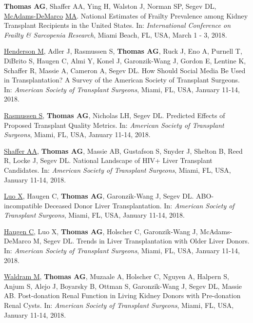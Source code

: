 \documentclass[10pt]{article}
\begin{document}
\begin{bibenum}
\item \textbf{Thomas AG}, Shaffer AA, Ying H, Walston J,
  Norman SP, Segev DL, \underline{McAdams-DeMarco} \underline{MA}.
  National Estimates of Frailty Prevalence among Kidney
  Transplant Recipients in the United States.
  In: \emph{International Conference on Frailty \& Sarcopenia Research},
  Miami Beach, FL, USA, March 1 - 3, 2018.

\item \underline{Henderson M}, Adler J, Rasmussen S, \textbf{Thomas AG},
  Ruck J, Eno A, Purnell T, DiBrito S, Haugen C, Almi Y, Konel J,
  Garonzik-Wang J, Gordon E, Lentine K, Schaffer R, Massie A,
  Cameron A, Segev DL.
  How Should Social Media Be Used in Transplantation? A Survey of
  the American Society of Transplant Surgeons.
  In: \emph{American Society of Transplant Surgeons},
  Miami, FL, USA, January 11-14, 2018.

\item \underline{Rasmussen S}, \textbf{Thomas AG}, Nicholas LH, Segev DL.
  Predicted Effects of Proposed Transplant Quality Metrics.
  In: \emph{American Society of Transplant Surgeons},
  Miami, FL, USA, January 11-14, 2018.

\item \underline{Shaffer AA}, \textbf{Thomas AG}, Massie AB,
  Gustafson S, Snyder J, Shelton B, Reed R, Locke J, Segev DL.
  National Landscape of HIV+ Liver Transplant
  Candidates. In: \emph{American Society of Transplant Surgeons},
  Miami, FL, USA, January 11-14, 2018.

\item \underline{Luo X}, Haugen C, \textbf{Thomas AG}, Garonzik-Wang J,
  Segev DL.
  ABO-incompatible Deceased Donor Liver Transplantation.
  In: \emph{American Society of Transplant Surgeons},
  Miami, FL, USA, January 11-14, 2018.

\item \underline{Haugen C}, Luo X, \textbf{Thomas AG}, Holscher C,
  Garonzik-Wang J, McAdams-DeMarco M, Segev DL.
  Trends in Liver Transplantation with Older Liver Donors.
  In: \emph{American Society of Transplant Surgeons},
  Miami, FL, USA, January 11-14, 2018.

\item \underline{Waldram M}, \textbf{Thomas AG}, Muzaale A,
  Holscher C, Nguyen A, Halpern S, Anjum S, Alejo J, Boyarsky B, Ottman S,
  Garonzik-Wang J, Segev DL, Massie AB. Post-donation Renal Function in Living
  Kidney Donors with Pre-donation Renal Cysts.
  In: \emph{American Society of Transplant Surgeons},
  Miami, FL, USA, January 11-14, 2018.


\end{bibenum}
\end{document}
